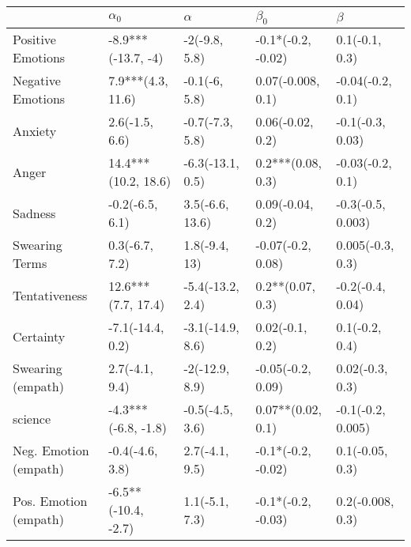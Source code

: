 \begin{tabular}{lllll}
\toprule
{} &           $\alpha_0$ &          $\alpha$ &           $\beta_0$ &            $\beta$ \\
\midrule
Positive Emotions     &   -8.9***(-13.7, -4) &     -2(-9.8, 5.8) &  -0.1*(-0.2, -0.02) &     0.1(-0.1, 0.3) \\
Negative Emotions     &    7.9***(4.3, 11.6) &     -0.1(-6, 5.8) &   0.07(-0.008, 0.1) &   -0.04(-0.2, 0.1) \\
Anxiety               &       2.6(-1.5, 6.6) &   -0.7(-7.3, 5.8) &    0.06(-0.02, 0.2) &   -0.1(-0.3, 0.03) \\
Anger                 &  14.4***(10.2, 18.6) &  -6.3(-13.1, 0.5) &   0.2***(0.08, 0.3) &   -0.03(-0.2, 0.1) \\
Sadness               &      -0.2(-6.5, 6.1) &   3.5(-6.6, 13.6) &    0.09(-0.04, 0.2) &  -0.3(-0.5, 0.003) \\
Swearing Terms        &       0.3(-6.7, 7.2) &     1.8(-9.4, 13) &   -0.07(-0.2, 0.08) &   0.005(-0.3, 0.3) \\
Tentativeness         &   12.6***(7.7, 17.4) &  -5.4(-13.2, 2.4) &    0.2**(0.07, 0.3) &   -0.2(-0.4, 0.04) \\
Certainty             &     -7.1(-14.4, 0.2) &  -3.1(-14.9, 8.6) &     0.02(-0.1, 0.2) &     0.1(-0.2, 0.4) \\
Swearing (empath)     &       2.7(-4.1, 9.4) &    -2(-12.9, 8.9) &   -0.05(-0.2, 0.09) &    0.02(-0.3, 0.3) \\
science               &  -4.3***(-6.8, -1.8) &   -0.5(-4.5, 3.6) &   0.07**(0.02, 0.1) &  -0.1(-0.2, 0.005) \\
Neg. Emotion (empath) &      -0.4(-4.6, 3.8) &    2.7(-4.1, 9.5) &  -0.1*(-0.2, -0.02) &    0.1(-0.05, 0.3) \\
Pos. Emotion (empath) &  -6.5**(-10.4, -2.7) &    1.1(-5.1, 7.3) &  -0.1*(-0.2, -0.03) &   0.2(-0.008, 0.3) \\
\bottomrule
\end{tabular}
